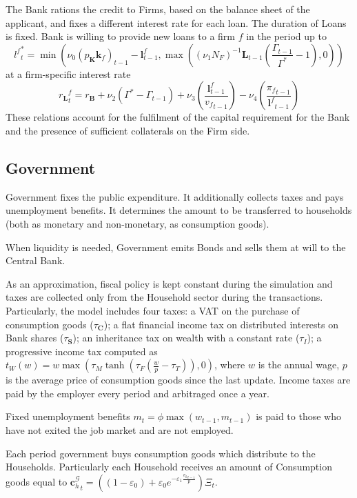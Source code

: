 \documentclass[a4paper, headings=standardclasses]{scrartcl}
\begin{document}
The Bank rations the credit to Firms, based on the balance sheet of the applicant, and fixes a different interest rate for each loan. The duration of Loans is fixed.
Bank is willing to provide new loans to a firm $f$ in the period up to $${l^f}^*_t = \min (\nu_0 (p_\mathbf{K}{\mathbf{k}_f})_{t-1} - \mathbf{l}^f_{t-1}, \max((\nu_1 N_F)^{-1} \mathbf{L}_{t-1} (\frac{\Gamma_{t-1}}{\Gamma^*}-1),0))$$ at a firm-specific interest rate $${r_\mathbf{L}}^f_t = r_\mathbf{B} + \nu_2 (\Gamma^* - \Gamma_{t-1}) + \nu_3 (\frac{\mathbf{l}^f_{t-1}}{{v_f}_{t-1}}) - \nu_4 (\frac{{\pi_f}_{t-1}}{{\mathbf{l}^f}_{t-1}})$$
These relations account for the fulfilment of the capital requirement for the Bank and the presence of sufficient collaterals on the Firm side.

\subsection{Government}
Government fixes the public expenditure. It additionally collects taxes and pays unemployment benefits. It determines the amount to be transferred to households (both as monetary and non-monetary, as consumption goods).

When liquidity is needed, Government emits Bonds and sells them at will to the Central Bank.

As an approximation, fiscal policy is kept constant during the simulation and taxes are collected only from the Household sector during the transactions. Particularly, the model includes four taxes: a VAT on the purchase of consumption goods ($\tau_\mathbf{C}$); a flat financial income tax on distributed interests on Bank shares ($\tau_\mathbf{S}$); an inheritance tax on wealth with a constant rate ($\tau_I$); a progressive income tax computed as $t_W(w) = w \max(\tau_M \tanh(\tau_F (\frac{w}{p} - \tau_T)),0)$, where $w$ is the annual wage, $p$ is the average price of consumption goods since the last update. Income taxes are paid by the employer every period and arbitraged once a year.

Fixed unemployment benefits $m_{t} = \phi \max(w_{t-1}, m_{t-1})$ is paid to those who have not exited the job market and are not employed.

Each period government buys consumption goods which distribute to the Households. Particularly each Household receives an amount of Consumption goods equal to ${\mathbf{c}^\mathcal{G}_h}_t = ((1 - \varepsilon_0) + \varepsilon_0 e^{-\varepsilon_1\frac{{v_h}_{t-1}}{p}})\Xi_t$.
\end{document}

